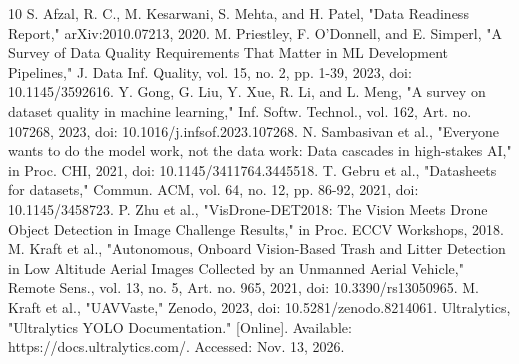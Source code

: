 \documentclass[conference]{IEEEtran}
\begin{document}
\begin{thebibliography}{10}
 S. Afzal, R. C., M. Kesarwani, S. Mehta, and H. Patel, "Data Readiness Report," arXiv:2010.07213, 2020.
 M. Priestley, F. O'Donnell, and E. Simperl, "A Survey of Data Quality Requirements That Matter in ML Development Pipelines," J. Data Inf. Quality, vol. 15, no. 2, pp. 1-39, 2023, doi: 10.1145/3592616.
 Y. Gong, G. Liu, Y. Xue, R. Li, and L. Meng, "A survey on dataset quality in machine learning," Inf. Softw. Technol., vol. 162, Art. no. 107268, 2023, doi: 10.1016/j.infsof.2023.107268.
 N. Sambasivan et al., "Everyone wants to do the model work, not the data work: Data cascades in high-stakes AI," in Proc. CHI, 2021, doi: 10.1145/3411764.3445518.
 T. Gebru et al., "Datasheets for datasets," Commun. ACM, vol. 64, no. 12, pp. 86-92, 2021, doi: 10.1145/3458723.
 P. Zhu et al., "VisDrone-DET2018: The Vision Meets Drone Object Detection in Image Challenge Results," in Proc. ECCV Workshops, 2018.
 M. Kraft et al., "Autonomous, Onboard Vision-Based Trash and Litter Detection in Low Altitude Aerial Images Collected by an Unmanned Aerial Vehicle," Remote Sens., vol. 13, no. 5, Art. no. 965, 2021, doi: 10.3390/rs13050965.
 M. Kraft et al., "UAVVaste," Zenodo, 2023, doi: 10.5281/zenodo.8214061.
 Ultralytics, "Ultralytics YOLO Documentation." [Online]. Available: https://docs.ultralytics.com/. Accessed: Nov. 13, 2026.
\end{thebibliography}
\end{document}
